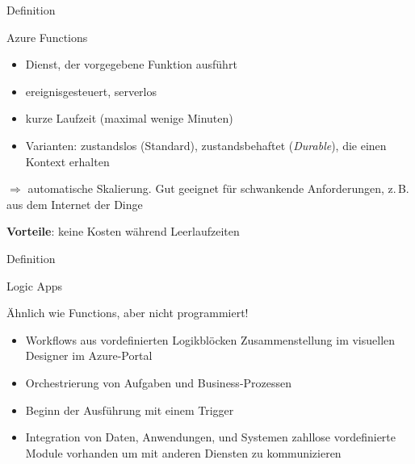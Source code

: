 \documentclass{scrartcl}
\newenvironment{flashcard}[2][]{%
    #1
    \vfill
    \centerline{\Large{#2}}
    \vfill
\newpage
}
{\newpage}
\begin{document}
    \begin{flashcard}[Definition]{Azure Functions}
        \begin{itemize}
            \item Dienst, der vorgegebene Funktion ausführt
            \item ereignisgesteuert, serverlos
            \item kurze Laufzeit (maximal wenige Minuten)
            \item Varianten: zustandslos (Standard), zustandsbehaftet (\emph{Durable}), die einen Kontext erhalten
        \end{itemize}
        $\Rightarrow$ automatische Skalierung. Gut geeignet für schwankende Anforderungen, z.\,B. aus dem Internet der Dinge

        \vspace{5mm}
        \textbf{Vorteile}: keine Kosten während Leerlaufzeiten
    \end{flashcard}

    \begin{flashcard}[Definition]{Logic Apps}
        Ähnlich wie Functions, aber nicht programmiert!
        \begin{itemize}
            \item Workflows aus vordefinierten Logikblöcken\newline
            Zusammenstellung im visuellen Designer im Azure-Portal
            \item Orchestrierung von Aufgaben und Business-Prozessen
            \item Beginn der Ausführung mit einem Trigger
            \item Integration von Daten, Anwendungen, und Systemen\newline
            zahllose vordefinierte Module vorhanden um mit anderen Diensten zu kommunizieren
        \end{itemize}

    \end{flashcard}
\end{document}
